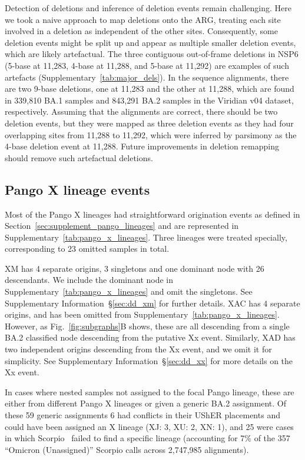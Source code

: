 \documentclass[12pt]{article}
\newcommand{\supref}[1]{Supplementary Information~\S\ref{#1}}
\newcommand{\figref}[1]{Fig.~\ref{#1}}
\newcommand{\siref}[1]{Supplementary~\ref{#1}}
\begin{document}
Detection of deletions and inference of deletion events
remain challenging.
Here we took a naive approach to map deletions onto the ARG,
treating each site involved in a deletion
as independent of the other sites.
Consequently, some deletion events might be split up and
appear as multiple smaller deletion events,
which are likely artefactual.
The three contiguous out-of-frame deletions in NSP6
(5-base at 11,283, 4-base at 11,288, and 5-base at 11,292)
are examples of such artefacts (\siref{tab:major_dels}).
In the sequence alignments, there are two 9-base deletions,
one at 11,283 and the other at 11,288,
which are found in
339,810 BA.1 samples and 843,291 BA.2 samples
in the Viridian v04 dataset, respectively.
Assuming that the alignments are correct,
there should be two deletion events,
but they were mapped as three deletion events
as they had four overlapping sites from 11,288 to 11,292,
which were inferred by parsimony
as the 4-base deletion event at 11,288.
Future improvements in deletion remapping
should remove such artefactual deletions.


\subsection{Pango X lineage events}
\label{sec:supplement_x_pango_lineages}

Most of the Pango X lineages had straightforward origination events
as defined in Section~\ref{sec:supplement_pango_lineages}
and are represented in \siref{tab:pango_x_lineages}.
Three lineages were treated specially,
corresponding to 23 omitted samples in total.

XM has 4 separate origins, 3 singletons and one dominant node
with 26 descendants. We include the dominant node in
\siref{tab:pango_x_lineages} and omit the singletons. See
\supref{sec:dd_xm} for further details.
XAC has 4 separate origins, and has been omitted from
\siref{tab:pango_x_lineages}. However, as \figref{fig:subgraphs}B
shows, these are all descending from a single BA.2 classified node
descending from the putative Xx event.
Similarly, XAD has two independent origins descending from the Xx
event, and we omit it for simplicity.
See \supref{sec:dd_xx} for more details on the Xx event.

In cases where nested samples not assigned to the focal Pango lineage,
these are
either from different Pango X lineages
or given a generic BA.2 assignment. Of these 59 generic assignments
6 had conflicts in their UShER placements and could have been
assigned an X lineage (XJ: 3, XU: 2, XN: 1), and
25 were cases in which Scorpio~\cite{Colquhoun2023scorpio}
failed to find a specific lineage (accounting for 7\%
of the 357 ``Omicron (Unassigned)'' Scorpio calls across
2,747,985 alignments).
\end{document}
